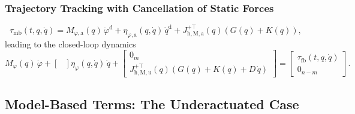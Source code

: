\subsubsection{Trajectory Tracking with Cancellation of Static Forces}
\begin{equation}
    \tau_\mathrm{mb}(t, q, \dot{q}) = M_{\varphi,\mathrm{a}}(q) \, \ddot{\varphi}^\mathrm{d} + \eta_{\varphi,\mathrm{a}}(q,\dot{q}) \, \dot{q}^\mathrm{d} + J_{\mathrm{h},\mathrm{M},\mathrm{a}}^{+\top}(q) \left ( G(q) + K(q) \right ),
\end{equation}
leading to the closed-loop dynamics
\begin{equation}
    M_\varphi(q) \, \ddot{\varphi} + \begin{bmatrix}
        
    \end{bmatrix} \eta_\varphi(q,\dot{q}) \, \dot{q} + \begin{bmatrix}
        0_m\\ J_{\mathrm{h},\mathrm{M},\mathrm{u}}^{+\top}(q) \left ( G(q) + K(q) + D \, \dot{q} \right )
    \end{bmatrix} = \begin{bmatrix}
        \tau_\mathrm{fb}(t, q, \dot{q})\\ 0_{n-m}
    \end{bmatrix}.
\end{equation}


\subsection{Model-Based Terms: The Underactuated Case}\label{sub:background:model_based_control:model_based_terms_underactuated}

